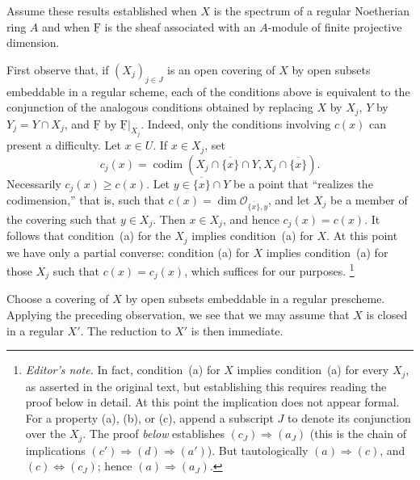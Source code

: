 \documentclass[10pt,a4paper]{article}
\newcommand{\uF}{\underline{\mathrm F}}
\newcommand{\cF}{\uF}
\newcommand{\codim}{\operatorname{codim}}
\newcommand{\markedfootnote}[2]{\begingroup\renewcommand{\thefootnote}{#1}\footnote{#2}\endgroup}
\theoremstyle{sgatheorem}
\theoremstyle{plain}
\numberwithin{equation}{section}
\begin{document}

\medskip
Assume these results established when $X$ is the spectrum of a regular
Noetherian ring $A$ and when $\cF$ is the sheaf associated with an $A$-module
of finite projective dimension.

First observe that, if $(X_j)_{j\in J}$ is an open covering of $X$ by open
subsets embeddable in a regular scheme, each of the conditions above is
equivalent to the conjunction of the analogous conditions obtained by
replacing $X$ by $X_j$, $Y$ by $Y_j=Y\cap X_j$, and $\cF$ by
$\cF|_{X_j}$. Indeed, only the conditions involving $c(x)$ can present a
difficulty. Let $x\in U$. If $x\in X_j$, set
\[
  c_j(x)=\codim(X_j\cap\overline{\{x\}}\cap Y,
                X_j\cap\overline{\{x\}}).
\]
Necessarily $c_j(x)\geq c(x)$. Let $y\in\overline{\{x\}}\cap Y$ be a point
that ``realizes the codimension,'' that is, such that
$c(x)=\dim\mathcal O_{\overline{\{x\}},y}$, and let $X_j$ be a member of
the covering such that $y\in X_j$. Then $x\in X_j$, and hence
$c_j(x)=c(x)$. It follows that condition~(a) for the $X_j$ implies
condition~(a) for $X$. At this point we have only a partial converse: condition
(a) for $X$ implies condition~(a) for those $X_j$ such that
$c(x)=c_j(x)$, which suffices for our purposes.%
\markedfootnote{(5)}{\textit{Editor's note.} In fact, condition~(a) for $X$
implies condition~(a) for every $X_j$, as asserted in the original text, but
establishing this requires reading the proof below in detail. At this point
the implication does not appear formal. For a property (a), (b), or (c),
append a subscript $J$ to denote its conjunction over the $X_j$. The proof
\textit{below} establishes $(c_J)\Rightarrow(a_J)$ (this is the chain of implications
$(c')\Rightarrow(d)\Rightarrow(a')$). But tautologically
$(a)\Rightarrow(c)$, and $(c)\Longleftrightarrow(c_J)$; hence
$(a)\Rightarrow(a_J)$.}


\setcounter{section}{2}\setcounter{lemma}{3}

\medskip
Choose a covering of $X$ by open subsets embeddable in a regular prescheme.
Applying the preceding observation, we see that we may assume that $X$ is
closed in a regular $X'$. The reduction to $X'$ is then immediate.
\end{document}
